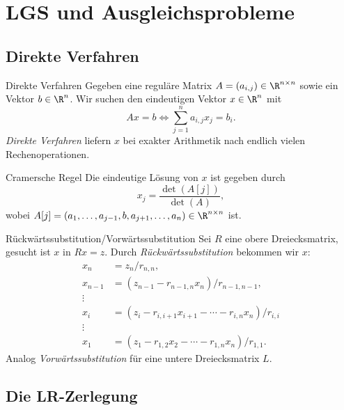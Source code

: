 \section*{LGS und Ausgleichsprobleme}

\subsection*{Direkte Verfahren}

\begin{karte}{Direkte Verfahren}
    Gegeben eine reguläre Matrix \( A = (a_{i,j}) \in \R^{n\times n} \) sowie ein Vektor 
    \( b \in \R^n \). Wir suchen den eindeutigen Vektor \(x \in \R^n\) mit 
    \[ Ax = b \Leftrightarrow \sum_{j=1}^n a_{i,j} x_j = b_i. \]
    \textit{Direkte Verfahren} liefern \(x \) bei exakter Arithmetik nach 
    endlich vielen Rechenoperationen.
\end{karte}

\begin{karte}{Cramersche Regel}
    Die eindeutige Lösung von \( x \) ist gegeben durch 
    \[ x_j = \frac{ \det(A[j]) }{ \det(A) }, \]
    wobei \( A[j] = (a_1, \ldots, a_{j-1}, b, a_{j+1}, \ldots, a_n) \in \R^{n\times n} \) ist.
\end{karte}

\begin{karte}{Rückwärtssubstitution/Vorwärtssubstitution}
    Sei \( R \) eine obere Dreiecksmatrix, gesucht ist \(x\) in \( Rx = z \).
    Durch \textit{Rückwärtssubstitution} bekommen wir \(x\):
    \begin{align*}
        x_n &= z_n / r_{n,n}, \\
        x_{n-1} &= (z_{n-1} - r_{n-1,n} x_n) / r_{n-1,n-1}, \\
        \vdots \\
        x_i &= (z_i - r_{i,i+1} x_{i+1} - \cdots - r_{i,n} x_n) / r_{i,i} \\
        \vdots \\
        x_1 &= (z_1 - r_{1,2}x_2 - \cdots - r_{1,n}x_n) / r_{1,1}.
    \end{align*}
    Analog \textit{Vorwärtssubstitution} für eine untere Dreiecksmatrix \(L\).
\end{karte}

\subsection*{Die LR-Zerlegung}

